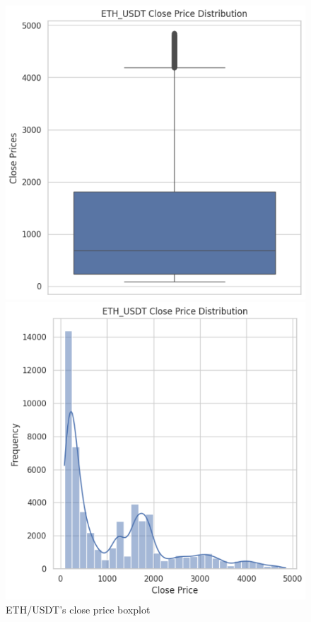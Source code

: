 \documentclass{ieeeojies}
\begin{document}
\begin{figure}[H]
    \centering
    \begin{minipage}{0.23\textwidth}
    \centering
    \includegraphics[width=1\textwidth]{bibliography/ETH_box.png}
    \caption{ETH/USDT's close price boxplot}
    \label{fig:enter-label}
    \end{minipage}
    \hfill
    \begin{minipage}{0.23\textwidth}
    \centering
    \includegraphics[width=1\textwidth]{bibliography/ETH_hist.png}

\end{minipage}
\end{figure}
\end{document}
